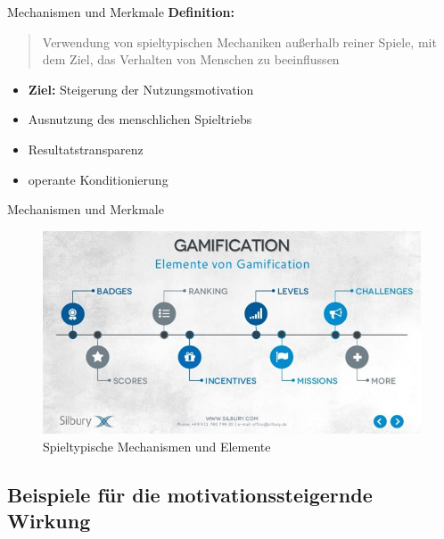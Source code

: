 \documentclass[hyphens]{beamer}
\begin{document}
\begin{frame}{Mechanismen und Merkmale}
\textbf{Definition:} \\
\blockquote{Verwendung von spieltypischen Mechaniken außerhalb reiner Spiele, mit dem Ziel, das Verhalten von Menschen zu beeinflussen}
\hspace{0.5cm}
\begin{itemize}
	\item \textbf{Ziel:} Steigerung der Nutzungsmotivation
	\item Ausnutzung des menschlichen Spieltriebs
	\item Resultatstransparenz
	\item operante Konditionierung
\end{itemize}
\end{frame}

\begin{frame}{Mechanismen und Merkmale}
\begin{figure}
	\includegraphics[scale=0.45]{pics/elements}
	\caption{Spieltypische Mechanismen und Elemente}
\end{figure}
\end{frame}

\subsection{Beispiele für die motivationssteigernde Wirkung}
\end{document}
